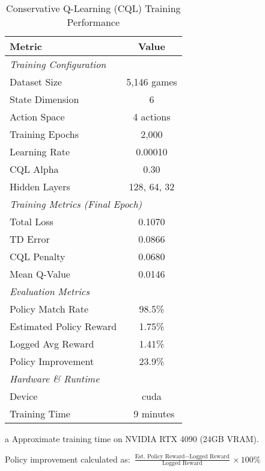 \begin{table}[htbp]
\centering
\caption{Conservative Q-Learning (CQL) Training Performance}
\label{tab:cql_performance}
\begin{threeparttable}
\begin{tabular}{lc}
\toprule
\textbf{Metric} & \textbf{Value} \\
\midrule
\multicolumn{2}{l}{\textit{Training Configuration}} \\
Dataset Size & 5,146 games \\
State Dimension & 6 \\
Action Space & 4 actions \\
Training Epochs & 2,000 \\
Learning Rate & 0.00010 \\
CQL Alpha & 0.30 \\
Hidden Layers & 128, 64, 32 \\
\midrule
\multicolumn{2}{l}{\textit{Training Metrics (Final Epoch)}} \\
Total Loss & 0.1070 \\
TD Error & 0.0866 \\
CQL Penalty & 0.0680 \\
Mean Q-Value & 0.0146 \\
\midrule
\multicolumn{2}{l}{\textit{Evaluation Metrics}} \\
Policy Match Rate & 98.5\% \\
Estimated Policy Reward & 1.75\% \\
Logged Avg Reward & 1.41\% \\
Policy Improvement & 23.9\% \\
\midrule
\multicolumn{2}{l}{\textit{Hardware \& Runtime}} \\
Device & cuda \\
Training Time & ~9 minutes\tnote{a} \\
\bottomrule
\end{tabular}
\begin{tablenotes}
\small
\item[a] Approximate training time on NVIDIA RTX 4090 (24GB VRAM).
\item Policy improvement calculated as: $\frac{\text{Est. Policy Reward} - \text{Logged Reward}}{\text{Logged Reward}} \times 100\%$
\end{tablenotes}
\end{threeparttable}
\end{table}
